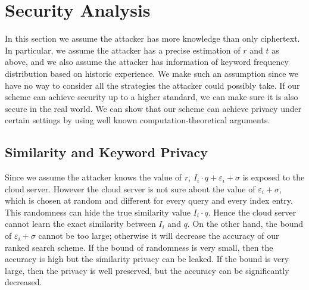 \documentclass{article}
\begin{document}
\section{Security Analysis}
In this section we assume the attacker has more knowledge than only ciphertext. In particular, we assume the attacker has a precise estimation of $r$ and $t$ as above, and we also assume the attacker has information of keyword frequency distribution based on historic experience. We make such an assumption since we have no way to consider all the strategies the attacker could possibly take. If our scheme can achieve security up to a higher standard, we can make sure it is also secure in the real world. We can show that our scheme can achieve privacy under certain settings by using well known computation-theoretical arguments.

\subsection{Similarity and Keyword Privacy}
Since we assume the attacker knows the value of $r$, $I_i\cdot q+\varepsilon_i+\sigma$ is exposed to the cloud server. However the cloud server is not sure about the value of $\varepsilon_i+\sigma$, which is chosen at random and different for every query and every index entry. This randomness can hide the true similarity value $I_i\cdot q$. Hence the cloud server cannot learn the exact similarity between $I_i$ and $q$. On the other hand, the bound of $\varepsilon_i+\sigma$ cannot be too large; otherwise it will decrease the accuracy of our ranked search scheme. If the bound of randomness is very small, then the accuracy is high but the similarity privacy can be leaked. If the bound is very large, then the privacy is well preserved, but the accuracy can be significantly decreased.
\end{document}
